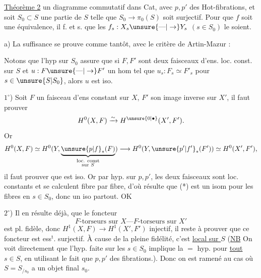 \uline{Théorème 2} 
un diagramme commutatif dans Cat, avec $p,p'$ des Hot-fibrations, et soit $S_0\subset S$ une partie de $S$ telle
que $S_0\to\pi_0(S)$ soit surjectif. Pour que $f$ soit
une équivalence, il f. et s. que les
$f_s:X_s\unsure{\text{---}|\to}Y_s$ $(s\in S_0)$ le soient.

a) La suffisance se prouve comme tantôt,
avec le critère de Artin-Mazur : 


Notons que l'hyp sur $S_0$ assure que si $F,F'$ sont
deux faisceaux d'ens. loc. const. sur $S$ et $u:F\unsure{\text{---}|\to}F'$
un hom   tel que $u_s:F_s\simeq F'_s$
pour $s\in\unsure{S|S_0}$, alors $u$ est iso.

$1^\circ$) Soit $F$ un faisceau d'ens  constant sur $X$,
$F'$ son image inverse sur $X'$, il faut prouver
\[
H^0(X,F)\xrightarrow{\sim}H^{\unsure{0|\bullet}}(X',F').
\]
Or
\[
H^0(X,F)\simeq H^0(Y,\underbrace{\unsure{p|f}_*(F)}_{\substack{\text{loc. const}\\\text{sur }S}})\longrightarrow H^0(Y,\unsure{p'|f'}_*(F'))\simeq H^0(X',F'),
\]
il faut prouver que 
est iso. Or par hyp. sur $p,p'$, les deux
faisceaux sont loc. constants et se calculent
fibre par fibre, d'où résulte que (*) est un
isom pour les fibres en $s\in S_0$, donc un iso
partout. OK

$2^\circ$) Il en résulte déjà,  que le foncteur
\[
F\text{-torseurs sur }X\text{---}F\text{-torseurs sur }X'
\]
est pl. fidèle, donc $H^1(X,F)\to H^1(X',F')$
injectif, il  reste à prouver que ce foncteur
est ess$^{\mathrm t}$. surjectif. À cause de la pleine
fidélité, c'est \uline{local sur $S$} (\uline{NB} On voit directement que l'hyp. faite sur les $s\in S_0$ implique
la $=$ hyp. pour \uline{tout} $s\in S$, en utilisant le
fait que $p,p'$  des fibrations.). Donc on est ramené
au cas où $S=S_{/s_0}$ a un objet final $s_0$.

